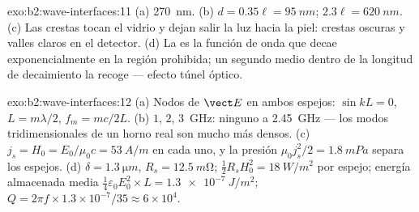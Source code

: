 \begin{solution}{exo:b2:wave-interfaces:11}
(a) \qty{270}{nm}. (b) $d = 0.35\ell = \qty{95}{nm}$; $2.3\ell = \qty{620}{nm}$. (c) Las
crestas tocan el vidrio y dejan salir la luz hacia la piel: crestas
oscuras y valles claros en el detector. (d) La  es la
función de onda que decae exponencialmente en la región prohibida; un segundo
medio dentro de la longitud de decaimiento la recoge --- efecto túnel óptico.
\end{solution}

\begin{solution}{exo:b2:wave-interfaces:12}
(a) Nodos de $\vect E$ en ambos espejos: $\sin kL = 0$, $L = m\lambda/2$, $f_m = mc/2L$.
(b) $1$, $2$, \qty{3}{GHz}: ninguno a \qty{2.45}{GHz} --- los modos
tridimensionales de un horno real son mucho más densos. (c) $j_s = H_0 = E_0/\mu_0c = \qty{53}{A/m}$
en cada uno, y la presión $\mu_0j_s^2/2 = \qty{1.8}{mPa}$ separa los espejos.
(d) $\delta = \qty{1.3}{\micro m}$, $R_s = \qty{12.5}{m\ohm}$; $\tfrac12R_sH_0^2 =
\qty{18}{W/m^2}$ por espejo; energía almacenada media $\tfrac14\varepsilon_0E_0^2 \times L = \qty{1.3e-7}{J/m^2}$;
$Q = 2\pi f \times 1.3 \times 10^{-7}/35 \approx 6 \times 10^4$.
\end{solution}

